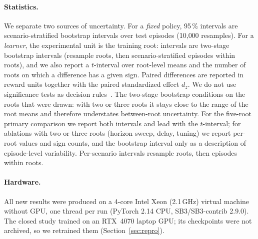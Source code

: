 \paragraph{Statistics.} We separate two sources of uncertainty. For a
\emph{fixed} policy, 95\,\% intervals are scenario-stratified bootstrap
intervals over test episodes (10{,}000 resamples). For a \emph{learner}, the
experimental unit is the training root: intervals are two-stage bootstrap
intervals (resample roots, then scenario-stratified episodes within roots), and
we also report a $t$-interval over root-level means and the number of roots on
which a difference has a given sign. Paired differences are reported in reward
units together with the paired standardized effect $d_z$. We do not use
significance tests as decision rules~\citep{agarwal2021precipice,patterson2024empirical}.
The two-stage bootstrap conditions on the roots that were drawn: with two or
three roots it stays close to the range of the root means and therefore
understates between-root uncertainty. For the five-root primary comparison we
report both intervals and lead with the $t$-interval; for ablations with two or
three roots (horizon sweep, delay, tuning) we report per-root values and sign
counts, and the bootstrap interval only as a description of episode-level
variability. Per-scenario intervals resample roots, then episodes within roots.

\paragraph{Hardware.} All new results were produced on a 4-core Intel Xeon
(2.1\,GHz) virtual machine without GPU, one thread per run (PyTorch 2.14 CPU,
SB3/SB3-contrib 2.9.0). The closed study trained on an RTX~4070 laptop GPU; its
checkpoints were not archived, so we retrained them (Section~\ref{sec:repro}).

